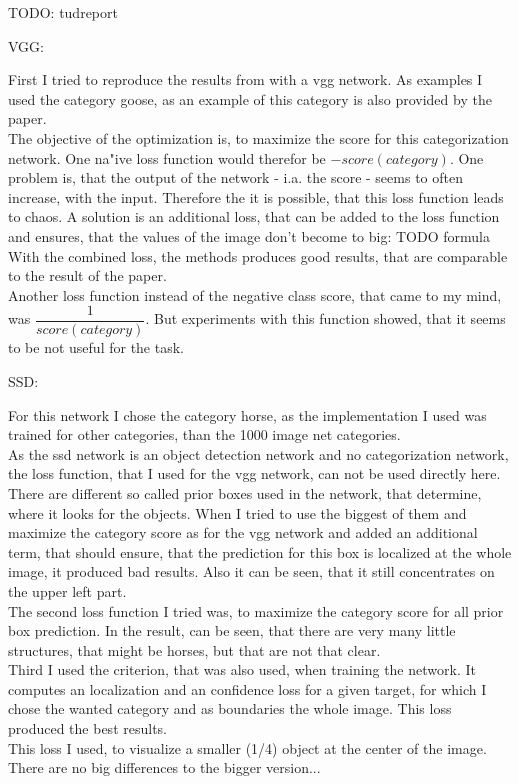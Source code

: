 TODO: tudreport


VGG:

First I tried to reproduce the results from \cite{...} with a vgg network. As examples I used the category goose, as an example of this category is also provided by the paper.\\
The objective of the optimization is, to maximize the score for this categorization network. One na"ive loss function would therefor be $-score(category)$. One problem is, that the output of the network - i.a. the score - seems to often increase, with the input. Therefore the it is possible, that this loss function leads to chaos.
A solution is an additional loss, that can be added to the loss function and ensures, that the values of the image don't become to big: TODO formula
With the combined loss, the methods produces good results, that are comparable to the result of the paper.\\

Another loss function instead of the negative class score, that came to my mind, was $\dfrac{1}{score(category)}$.
But experiments with this function showed, that it seems to be not useful for the task.

SSD:

For this network I chose the category horse, as the implementation I used was trained for other categories, than the 1000 image net categories.\\
As the ssd network is an object detection network and no categorization network, the loss function, that I used for the vgg network, can not be used directly here.
There are different so called prior boxes used in the network, that determine, where it looks for the objects. When I tried to use the biggest of them and maximize the category score as for the vgg network and added an additional term, that should ensure, that the prediction for this box is localized at the whole image, it produced bad results. Also it can be seen, that it still concentrates on the upper left part.\\
The second loss function I tried was, to maximize the category score for all prior box prediction. In the result, can be seen, that there are very many little structures, that might be horses, but that are not that clear.\\
Third I used the criterion, that was also used, when training the network. It computes an localization and an confidence loss for a given target, for which I chose the wanted category and as boundaries the whole image. This loss produced the best results.\\
This loss I used, to visualize a smaller (1/4) object at the center of the image. There are no big differences to the bigger version...
